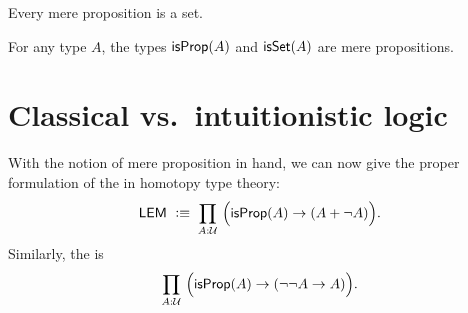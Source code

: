 \documentclass[hott-all.tex]{subfiles}
\begin{document}
\begin{lem}\label{thm:prop-set}
  Every mere proposition is a set.
\end{lem}
%


\begin{lem}\label{thm:isprop-isprop}\label{thm:isprop-isset}
  For any type $A$, the types $\mathsf{isProp}(A)$ and $\mathsf{isSet}(A)$ are mere propositions.
\end{lem}
%
%
%

\section{Classical vs.\ intuitionistic logic}
\label{sec:intuitionism}

With the notion of mere proposition in hand, we can now give the proper formulation of the 
in homotopy type theory:
\begin{equation}
  \label{eq:lem}
  \LEM{}\;\defeq\;
  \prd{A:\UU} \Big(\isprop(A) \to (A + \neg A)\Big).
\end{equation}
Similarly, the 
is
\begin{equation}
  \label{eq:ldn}
  \prd{A:\UU} \Big(\isprop(A) \to (\neg\neg A \to A)\Big).
\end{equation}
\end{document}
